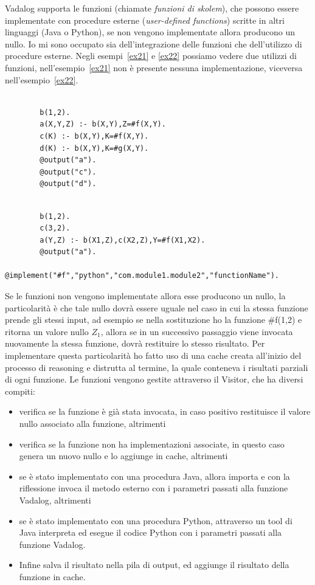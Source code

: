 Vadalog supporta le funzioni (chiamate \emph{funzioni di skolem}), che possono essere implementate con procedure esterne (\emph{user-defined functions}) scritte in altri linguaggi (Java o Python), se non vengono implementate allora producono un nullo. Io mi sono occupato sia dell'integrazione delle funzioni che dell'utilizzo di procedure esterne. \newline
Negli esempi~\ref{ex21} e \ref{ex22} possiamo vedere due utilizzi di funzioni, nell'esempio~\ref{ex21} non è presente nessuna implementazione, viceversa nell'esempio~\ref{ex22}. 
\begin{example}\label{ex21}
	\begin{lstlisting}
	
		b(1,2).
		a(X,Y,Z) :- b(X,Y),Z=#f(X,Y).
		c(K) :- b(X,Y),K=#f(X,Y).
		d(K) :- b(X,Y),K=#g(X,Y).
		@output("a").
		@output("c").
		@output("d").
	\end{lstlisting}
\end{example}\label{ex22}
\begin{example}
	\begin{lstlisting}
	
		b(1,2).
		c(3,2).
		a(Y,Z) :- b(X1,Z),c(X2,Z),Y=#f(X1,X2).
		@output("a").
		@implement("#f","python","com.module1.module2","functionName").
	\end{lstlisting}
\end{example}
Se le funzioni non vengono implementate allora esse producono un nullo, la particolarità è che tale nullo dovrà essere uguale nel caso in cui la stessa funzione prende gli stessi input, ad esempio se nella sostituzione ho la funzione \#f(1,2) e ritorna un valore nullo $Z_{1}$, allora se in un successivo passaggio viene invocata nuovamente la stessa funzione, dovrà restituire lo stesso risultato. \newline
Per implementare questa particolarità ho fatto uso di una cache creata all'inizio del processo di reasoning e distrutta al termine, la quale conteneva i risultati parziali di ogni funzione. \newline
Le funzioni vengono gestite attraverso il Visitor, che ha diversi compiti: 
\begin{itemize}
	\item verifica se la funzione è già stata invocata, in caso positivo restituisce il valore nullo associato alla funzione, altrimenti
	\item verifica se la funzione non ha implementazioni associate, in questo caso genera un nuovo nullo e lo aggiunge in cache, altrimenti
	\item se è stato implementato con una procedura Java, allora importa e con la riflessione invoca il metodo esterno con i parametri passati alla funzione Vadalog, altrimenti
	\item se è stato implementato con una procedura Python, attraverso un tool di Java interpreta ed esegue il codice Python con i parametri passati alla funzione Vadalog.
	\item Infine salva il risultato nella pila di output, ed aggiunge il risultato della funzione in cache.
\end{itemize}

